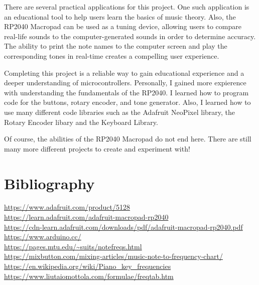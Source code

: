 \documentclass{article}
\begin{document}
There are several practical applications for this project. One such application is an educational tool to help users learn the basics of music theory. Also, the RP2040 Macropad can be used as a tuning device, allowing users to compare real-life sounds to the computer-generated sounds in order to determine accuracy. The ability to print the note names to the computer screen and play the corresponding tones in real-time creates a compelling user experience. 

Completing this project is a reliable way to gain educational experience and a deeper understanding of microcontrollers. Personally, I gained more expierence with understanding the fundamentals of the RP2040. I learned how to program code for the buttons, rotary encoder, and tone generator. Also, I learned how to use many different code libraries such as the Adafruit NeoPixel library, the Rotary Encoder libary and the Keyboard Library.

Of course, the abilities of the RP2040 Macropad do not end here. There are still many more different projects to create and experiment with!


\section{Bibliography}

\url{https://www.adafruit.com/product/5128} \\
\url{https://learn.adafruit.com/adafruit-macropad-rp2040} \\
\url{https://cdn-learn.adafruit.com/downloads/pdf/adafruit-macropad-rp2040.pdf} \\
\url{https://www.arduino.cc/} \\ 
\url{https://pages.mtu.edu/~suits/notefreqs.html} \\
\url{https://mixbutton.com/mixing-articles/music-note-to-frequency-chart/} \\
\url{https://en.wikipedia.org/wiki/Piano_key_frequencies} \\
\url{https://www.liutaiomottola.com/formulae/freqtab.htm} \\

\end{document}
